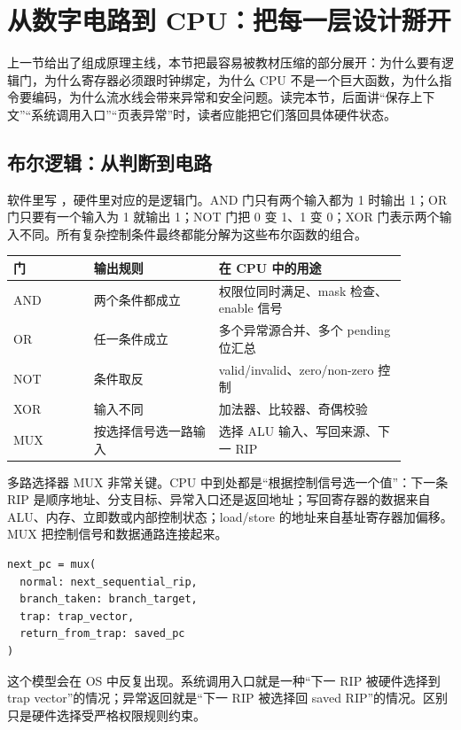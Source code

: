 \section{从数字电路到 CPU：把每一层设计掰开}

上一节给出了组成原理主线，本节把最容易被教材压缩的部分展开：为什么要有逻辑门，为什么寄存器必须跟时钟绑定，为什么 CPU 不是一个巨大函数，为什么指令要编码，为什么流水线会带来异常和安全问题。读完本节，后面讲“保存上下文”“系统调用入口”“页表异常”时，读者应能把它们落回具体硬件状态。

\subsection{布尔逻辑：从判断到电路}

软件里写 ，硬件里对应的是逻辑门。AND 门只有两个输入都为 1 时输出 1；OR 门只要有一个输入为 1 就输出 1；NOT 门把 0 变 1、1 变 0；XOR 门表示两个输入不同。所有复杂控制条件最终都能分解为这些布尔函数的组合。

\begin{longtable}{p{0.18\linewidth}p{0.28\linewidth}p{0.42\linewidth}}
\toprule
门 & 输出规则 & 在 CPU 中的用途 \\
\midrule
AND & 两个条件都成立 & 权限位同时满足、mask 检查、enable 信号 \\
OR & 任一条件成立 & 多个异常源合并、多个 pending 位汇总 \\
NOT & 条件取反 & valid/invalid、zero/non-zero 控制 \\
XOR & 输入不同 & 加法器、比较器、奇偶校验 \\
MUX & 按选择信号选一路输入 & 选择 ALU 输入、写回来源、下一 RIP \\
\bottomrule
\end{longtable}

多路选择器 MUX 非常关键。CPU 中到处都是“根据控制信号选一个值”：下一条 RIP 是顺序地址、分支目标、异常入口还是返回地址；写回寄存器的数据来自 ALU、内存、立即数或内部控制状态；load/store 的地址来自基址寄存器加偏移。MUX 把控制信号和数据通路连接起来。

\begin{lstlisting}
next_pc = mux(
  normal: next_sequential_rip,
  branch_taken: branch_target,
  trap: trap_vector,
  return_from_trap: saved_pc
)
\end{lstlisting}

这个模型会在 OS 中反复出现。系统调用入口就是一种“下一 RIP 被硬件选择到 trap vector”的情况；异常返回就是“下一 RIP 被选择回 saved RIP”的情况。区别只是硬件选择受严格权限规则约束。


